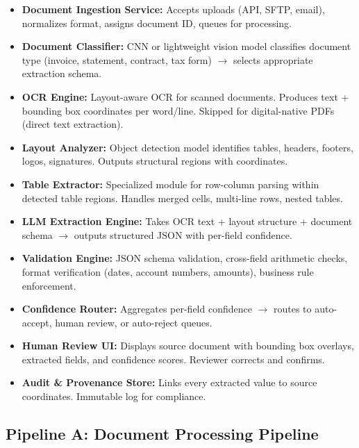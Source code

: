\begin{itemize}
  \item \textbf{Document Ingestion Service:} Accepts uploads (API, SFTP, email), normalizes format, assigns document ID, queues for processing.
  \item \textbf{Document Classifier:} CNN or lightweight vision model classifies document type (invoice, statement, contract, tax form) $\rightarrow$ selects appropriate extraction schema.
  \item \textbf{OCR Engine:} Layout-aware OCR for scanned documents. Produces text + bounding box coordinates per word/line. Skipped for digital-native PDFs (direct text extraction).
  \item \textbf{Layout Analyzer:} Object detection model identifies tables, headers, footers, logos, signatures. Outputs structural regions with coordinates.
  \item \textbf{Table Extractor:} Specialized module for row-column parsing within detected table regions. Handles merged cells, multi-line rows, nested tables.
  \item \textbf{LLM Extraction Engine:} Takes OCR text + layout structure + document schema $\rightarrow$ outputs structured JSON with per-field confidence.
  \item \textbf{Validation Engine:} JSON schema validation, cross-field arithmetic checks, format verification (dates, account numbers, amounts), business rule enforcement.
  \item \textbf{Confidence Router:} Aggregates per-field confidence $\rightarrow$ routes to auto-accept, human review, or auto-reject queues.
  \item \textbf{Human Review UI:} Displays source document with bounding box overlays, extracted fields, and confidence scores. Reviewer corrects and confirms.
  \item \textbf{Audit \& Provenance Store:} Links every extracted value to source coordinates. Immutable log for compliance.
\end{itemize}

\subsection*{Pipeline A: Document Processing Pipeline}


